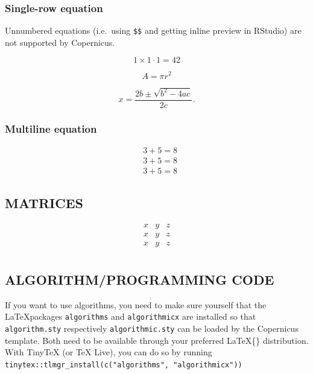 \documentclass[gc, manuscript]{copernicus}
\begin{document}
\subsubsection{Single-row equation}

Unnumbered equations (i.e.~using \texttt{\$\$} and getting inline
preview in RStudio) are not supported by Copernicus.

\begin{equation}
1 \times 1 \cdot 1 = 42
\end{equation}

\begin{equation}
A = \pi r^2
\end{equation}

\begin{equation}
x=\frac{2b\pm\sqrt{b^{2}-4ac}}{2c}.  
\end{equation}

\subsubsection{Multiline equation}

\begin{align}
& 3 + 5 = 8\\
& 3 + 5 = 8\\
& 3 + 5 = 8
\end{align}

\subsection{MATRICES}

\[
\begin{matrix}
x & y & z\\
x & y & z\\
x & y & z\\
\end{matrix}
\]

\subsection{ALGORITHM/PROGRAMMING CODE}

If you want to use algorithms, you need to make sure yourself that the
\LaTeX packages \texttt{algorithms} and \texttt{algorithmicx} are
installed so that \texttt{algorithm.sty} respectively
\texttt{algorithmic.sty} can be loaded by the Copernicus template. Both
need to be available through your preferred \LaTeX\{\} distribution.
With TinyTeX (or TeX Live), you can do so by running
\texttt{tinytex::tlmgr\_install(c("algorithms",\ "algorithmicx"))}
\end{document}
